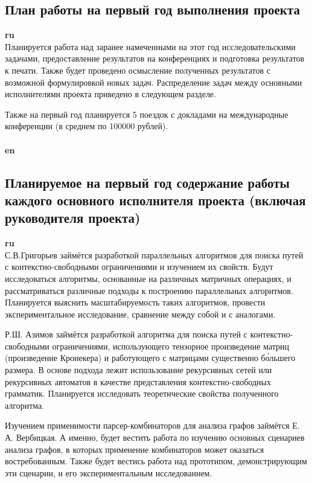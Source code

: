\documentclass[12pt]{article}  %
\theoremstyle{remark}
\begin{document}
\subsection{План работы на первый год выполнения проекта}

\textbf{ru}\\
%
Планируется работа над заранее намеченными на этот год исследовательскими задачами, предоставление результатов на конференциях и подготовка результатов к печати.
Также будет проведено осмысление полученных результатов с возможной формулировкой новых задач. Распределение задач между основными исполнителями проекта приведено в следующем разделе.

Также на первый год планируется 5 поездок с докладами на международные конференции (в среднем по 100000 рублей).
\\
\\
\textbf{en}\\




\subsection{Планируемое на первый год содержание работы каждого основного исполнителя проекта (включая руководителя проекта)}

\textbf{ru}\\
%
С.В.Григорьев займётся разработкой параллельных алгоритмов для поиска путей с контекстно-свободными ограничениями и изучением их свойств.
Будут исследоваться алгоритмы, основанные на различных матричных операциях, и рассматриваться различные подходы к построению параллельных алгоритмов.
Планируется выяснить масштабируемость таких алгоритмов, провести экспериментальное исследование, сравнение между собой и с аналогами.

Р.Ш. Азимов займётся разработкой алгоритма для поиска путей с контекстно-свободными ограничениями, использующего тензорное произведение матриц (произведение Кронекера) и работующего с матрицами существенно б\'{о}льшего размера.
В основе подхода лежит использование рекурсивных сетей или рекурсивных автоматов в качестве представления контекстно-свободных грамматик.
Планируется исследовать теоретические свойства полученного алгоритма.

Изучением применимости парсер-комбинаторов для анализа графов займётся Е. А. Вербицкая.
А именно, будет вестить работа по изучению основных сценариев анализа графов, в которых применение комбинаторов может оказаться востребованным.
Также будет вестись работа над прототипом, демонстрирующим эти сценарии, и его экспериментальным исследованием.
\end{document}
